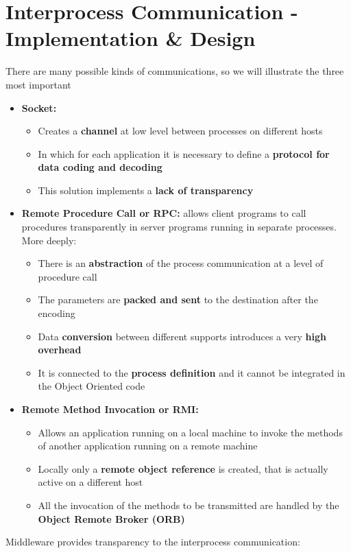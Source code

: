 \chapter{Interprocess Communication - Implementation \& Design}
There are many possible kinds of communications, so we will illustrate the three most important
\begin{itemize}
    \item \textbf{Socket:}
        \begin{itemize}
            \item Creates a \textbf{channel} at low level between processes on different hosts
            \item In which for each application it is necessary to define a \textbf{protocol for data coding and decoding}
            \item This solution implements a \textbf{lack of transparency}
        \end{itemize}
    \item \textbf{Remote Procedure Call or RPC:} allows client programs to call procedures transparently in server programs running in separate processes. More deeply:
        \begin{itemize}
            \item There is an \textbf{abstraction} of the process communication at a level of procedure call
            \item The parameters are \textbf{packed and sent} to the destination after the encoding
            \item Data \textbf{conversion} between different supports introduces a very \textbf{high overhead}
            \item It is connected to the \textbf{process definition} and it cannot be integrated in the Object Oriented code
        \end{itemize}
    \item \textbf{Remote Method Invocation or RMI:}
        \begin{itemize}
            \item Allows an application running on a local machine to invoke the methods of another application running on a remote machine
            \item Locally only a \textbf{remote object reference} is created, that is actually active on a different host
            \item All the invocation of the methods to be transmitted are handled by the \textbf{Object Remote Broker (ORB)}
        \end{itemize}
\end{itemize}
Middleware provides transparency to the interprocess communication:

